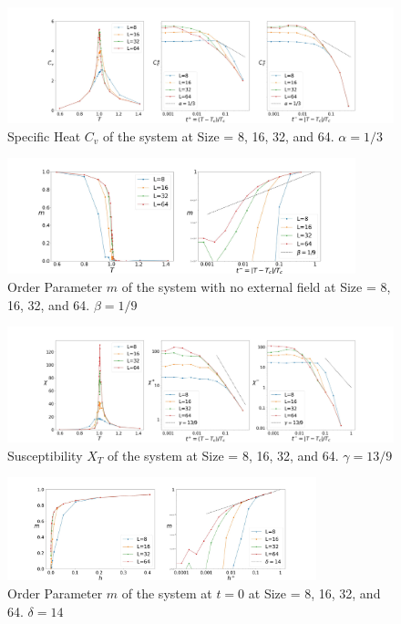 \documentclass[%
 reprint,
 amsmath,amssymb,
 aps,
]{revtex4-2}
\begin{document}
\begin{figure}[b]
\includegraphics[width=1\textwidth]{../fig/Alpha, Specific Heat (3-state 2D Potts).jpg}
\caption{\label{fig:alpha} Specific Heat $C_{v}$ of the system at Size = 8, 16, 32, 
and 64. $\alpha = 1/3$}
\end{figure}

\begin{figure}[b]
\includegraphics[width=0.9\textwidth]{../fig/Beta, Order Parameter (3-state 2D Potts).jpg}
\caption{\label{fig:beta} Order Parameter $m$ of the system with no external field 
at Size = 8, 16, 32, and 64. $\beta = 1/9$}
\end{figure}

\begin{figure}[b]
\includegraphics[width=1\textwidth]{../fig/Gamma, Susceptibility (3-state 2D Potts).jpg}
\caption{\label{fig:gamma} Susceptibility $X_{T}$ of the system at Size = 8, 16, 32, 
and 64. $\gamma = 13/9$}
\end{figure}

\begin{figure}[b]
\includegraphics[width=0.8\textwidth]{../fig/Delta, Order Parameter (3-state 2D Potts).jpg}
\caption{\label{fig:delta} Order Parameter $m$ of the system at $t=0$ at Size = 8, 16, 32, 
and 64. $\delta = 14$}
\end{figure}
\end{document}
